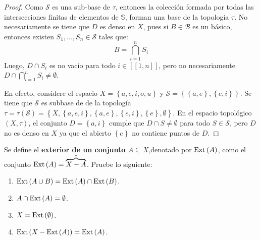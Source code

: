 \documentclass[12pt]{report}
\theoremstyle{largebreak}
\newcommand\natint[1]{\ensuremath{\left[\!\left[#1\right]\!\right] }}
\newcommand{\Int}[1]{\ensuremath{\mathring{#1}}}
\newcommand{\Ext}[1]{\ensuremath{\textup{Ext}\left(#1\right)}}
\begin{document}
    \begin{proof}
        Como $\mathcal{S}$ es una sub-base de $\tau$, entonces la colección formada por todas las intersecciones finitas de elementos de $\mathbb{S}$, forman una base de la topología $\tau$.
        No necesariamente se tiene que $D$ es denso en $X$, pues si $B\in\mathcal{B}$ es un básico, entonces existen $S_1,...,S_n\in\mathcal{S}$ tales que:
        \begin{equation*}
            B=\bigcap_{i=1}^nS_i
        \end{equation*}
        Luego, $D\cap S_i$ es no vacío para todo $i\in\natint{1,n}$, pero no necesariamente $D\cap\bigcap_{ i=1}^nS_i\neq\emptyset$.

        En efecto, considere el espacio $X=\left\{a,e,i,o,u \right\}$ y $\mathcal{S}=\left\{\left\{ a,e\right\},\left\{ e,i\right\} \right\}$. Se tiene que $\mathcal{S}$ es subbase de de la topología $\tau=\tau(\mathcal{S})=\left\{X,\left\{ a,e,i\right\},\left\{ a,e\right\},\left\{ e,i\right\},\left\{e\right\},\emptyset \right\}$. En el espacio topológico $(X,\tau)$, el conjunto $D=\left\{a,i\right\}$ cumple que $D\cap S\neq\emptyset$ para todo $S\in\mathcal{S}$, pero $D$ no es denso en $X$ ya que el abierto $\left\{e\right\}$ no contiene puntos de $D$.
    \end{proof}

    \begin{excer}
        
    \end{excer}

    \begin{excer}
        
    \end{excer}
    
    \begin{excer}
        
    \end{excer}

    \begin{excer}
        Se define el \textbf{exterior de un conjunto $A\subseteq X$},denotado por $\Ext{A}$, como el conjunto $\Ext{A}=\Int{\overbrace{X-A}}$. Pruebe lo siguiente:
        \begin{enumerate}
            \item $\Ext{A\cup B}=\Ext{A}\cap\Ext{B}$.
            \item $A\cap\Ext{A}=\emptyset$.
            \item $X=\Ext{\emptyset}$.
            \item $\Ext{X-\Ext{A}}=\Ext{A}$.
        \end{enumerate}
    \end{excer}
\end{document}
